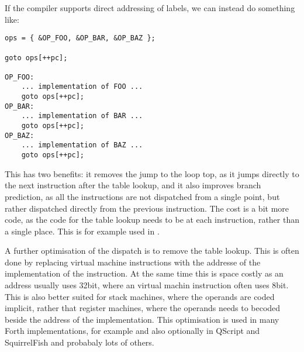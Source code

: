 If the compiler supports direct addressing of labels, we can instead do something like:
\begin{verbatim}
ops = { &OP_FOO, &OP_BAR, &OP_BAZ };
   
goto ops[++pc];

OP_FOO:
    ... implementation of FOO ...
    goto ops[++pc];
OP_BAR:
    ... implementation of BAR ...
    goto ops[++pc];
OP_BAZ:
    ... implementation of BAZ ...
    goto ops[++pc];
\end{verbatim}
This has two benefits: it removes the jump to the loop top, as it jumps directly to the next instruction after the table lookup, and it also improves branch prediction, as all the instructions are not dispatched from a single point, but rather dispatched directly from the previous instruction. The cost is a bit more code, as the code for the table lookup needs to be at each instruction, rather than a single place. This is for example used in \cite{stack-vm-thingy}.

A further optimisation of the dispatch is to remove the table lookup. This is often done by replacing virtual machine instructions with the addresse of the implementation of the instruction. At the same time this is space costly as an address usually uses 32bit, where an virtual machin instruction often uses 8bit. This is also better suited for stack machines, where the operands are coded implicit, rather that register machines, where the operands needs to becoded beside the address of the implementation. This optimisation is used in many Forth implementations, for example\cite{forth-asm} and also optionally in QScript\cite{qscript} and SquirrelFish\cite{webkit-source} and probabaly lots of others.

